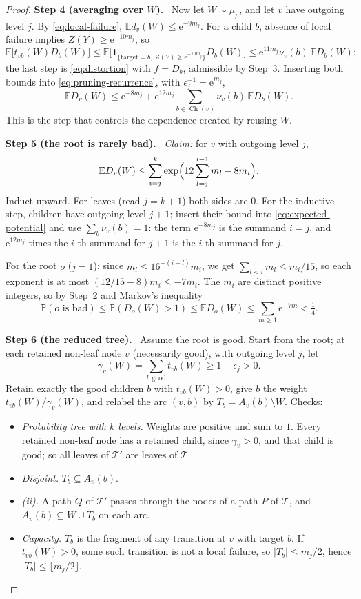 \documentclass[11pt]{article}
\numberwithin{equation}{section}
\newcommand{\PP}{\mathbb P}
\newcommand{\EE}{\mathbb E}
\newcommand{\ind}{\mathbf 1}
\newcommand{\TT}{\mathcal T}
\newcommand{\ch}{\operatorname{Ch}}
\newcommand{\ee}{\mathrm e}
\newcommand{\step}[1]{\par\smallskip\noindent\textbf{Step #1.}\ }
\begin{document}
\begin{proof}
\step{4 (averaging over $W$)} Now let $W\sim\mu_\rho$, and let $v$ have
outgoing level $j$. By \eqref{eq:local-failure},
$\EE d_v(W)\le\ee^{-9m_j}$. For a child $b$, absence of local failure
implies $Z(Y)\ge\ee^{-10m_j}$, so
\[
 \EE\bigl[t_{vb}(W)D_b(W)\bigr]
 \le\EE\bigl[\ind_{\{\mathrm{target}=b,\ Z(Y)\ge\ee^{-10m_j}\}}D_b(W)\bigr]
 \le\ee^{11m_j}\nu_v(b)\,\EE D_b(W);
\]
the last step is \eqref{eq:distortion} with $f=D_b$, admissible by
Step~3. Inserting both bounds into \eqref{eq:pruning-recurrence}, with
$\epsilon_j^{-1}=\ee^{m_j}$,
\begin{equation}\label{eq:expected-potential}
 \EE D_v(W)\le\ee^{-8m_j}
 +\ee^{12m_j}\sum_{b\in\ch(v)}\nu_v(b)\,\EE D_b(W).
\end{equation}
This is the step that controls the dependence created by reusing $W$.

\step{5 (the root is rarely bad)} \emph{Claim:} for $v$ with outgoing
level $j$,
\begin{equation}\label{eq:unrolled}
 \EE D_v(W)\le\sum_{i=j}^k
 \exp\Bigl(12\sum_{l=j}^{i-1}m_l-8m_i\Bigr).
\end{equation}
Induct upward. For leaves (read $j=k+1$) both sides are $0$. For the
inductive step, children have outgoing level $j+1$; insert their bound
into \eqref{eq:expected-potential} and use $\sum_b\nu_v(b)=1$: the term
$\ee^{-8m_j}$ is the summand $i=j$, and $\ee^{12m_j}$ times the $i$-th
summand for $j+1$ is the $i$-th summand for $j$.

For the root $o$ ($j=1$): since $m_l\le16^{-(i-l)}m_i$, we get
$\sum_{l<i}m_l\le m_i/15$, so each exponent is at most
$(12/15-8)m_i\le-7m_i$. The $m_i$ are distinct positive integers, so by
Step~2 and Markov's inequality
\[
 \PP(o\text{ is bad})\le\PP(D_o(W)>1)\le\EE D_o(W)
 \le\sum_{m\ge1}\ee^{-7m}<\tfrac14.
\]

\step{6 (the reduced tree)} Assume the root is good. Start from the
root; at each retained non-leaf node $v$ (necessarily good), with
outgoing level $j$, let
\[
 \gamma_v(W)=\sum_{b\text{ good}}t_{vb}(W)\ge1-\epsilon_j>0.
\]
Retain exactly the good children $b$ with $t_{vb}(W)>0$, give $b$ the
weight $t_{vb}(W)/\gamma_v(W)$, and relabel the arc $(v,b)$ by
$T_b=A_v(b)\setminus W$. Checks:
\begin{itemize}[itemsep=1pt,topsep=2pt]
 \item \emph{Probability tree with $k$ levels.} Weights are positive and
 sum to $1$. Every retained non-leaf node has a retained child, since
 $\gamma_v>0$, and that child is good; so all leaves of $\TT'$ are leaves
 of $\TT$.
 \item \emph{Disjoint.} $T_b\subseteq A_v(b)$.
 \item \emph{(ii).} A path $Q$ of $\TT'$ passes through the nodes of a
 path $P$ of $\TT$, and $A_v(b)\subseteq W\cup T_b$ on each arc.
 \item \emph{Capacity.} $T_b$ is the fragment of any transition at $v$
 with target $b$. If $t_{vb}(W)>0$, some such transition is not a local
 failure, so $|T_b|\le m_j/2$, hence $|T_b|\le\lfloor m_j/2\rfloor$.
\end{itemize}


\end{proof}
\end{document}
